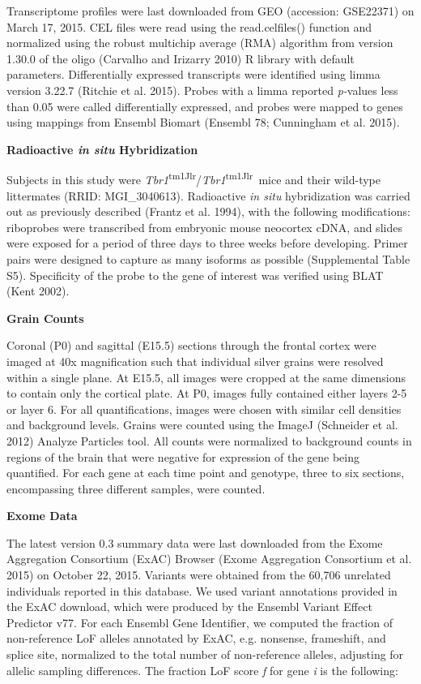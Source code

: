 \documentclass[]{article}
\begin{document}
Transcriptome profiles were last downloaded from GEO (accession:
GSE22371) on March 17, 2015. CEL files were read using the
read.celfiles() function and normalized using the robust multichip
average (RMA) algorithm from version 1.30.0 of the oligo (Carvalho and
Irizarry 2010) R library with default parameters. Differentially
expressed transcripts were identified using limma version 3.22.7
(Ritchie et al. 2015). Probes with a limma reported \emph{p­-}values
less than 0.05 were called differentially expressed, and probes were
mapped to genes using mappings from Ensembl Biomart (Ensembl 78;
Cunningham et al. 2015).

\textbf{Radioactive \emph{in situ} Hybridization}

Subjects in this study were
\emph{Tbr1}\textsuperscript{tm1Jlr}/\emph{Tbr1}\textsuperscript{tm1Jlr}~mice
and their wild-type littermates (RRID: MGI\_3040613). Radioactive
\emph{in situ} hybridization was carried out as previously described
(Frantz et al. 1994), with the following modifications: riboprobes were
transcribed from embryonic mouse neocortex cDNA, and slides were exposed
for a period of three days to three weeks before developing. Primer
pairs were designed to capture as many isoforms as possible
(Supplemental Table S5). Specificity of the probe to the gene of
interest was verified using BLAT (Kent 2002).

\textbf{Grain Counts}

Coronal (P0) and sagittal (E15.5) sections through the frontal cortex
were imaged at 40x magnification such that individual silver grains were
resolved within a single plane. At E15.5, all images were cropped at the
same dimensions to contain only the cortical plate. At P0, images fully
contained either layers 2-5 or layer 6. For all quantifications, images
were chosen with similar cell densities and background levels. Grains
were counted using the ImageJ (Schneider et al. 2012) Analyze Particles
tool. All counts were normalized to background counts in regions of the
brain that were negative for expression of the gene being quantified.
For each gene at each time point and genotype, three to six sections,
encompassing three different samples, were counted.

\textbf{Exome Data}

The latest version 0.3 summary data were last downloaded from the Exome
Aggregation Consortium (ExAC) Browser (Exome Aggregation Consortium et
al. 2015) on October 22, 2015. Variants were obtained from the 60,706
unrelated individuals reported in this database. We used variant
annotations provided in the ExAC download, which were produced by the
Ensembl Variant Effect Predictor v77. For each Ensembl Gene Identifier,
we computed the fraction of non-reference LoF alleles annotated by ExAC,
e.g. nonsense, frameshift, and splice site, normalized to the total
number of non-reference alleles, adjusting for allelic sampling
differences. The fraction LoF score \emph{f} for gene \emph{i} is the
following:
\end{document}
